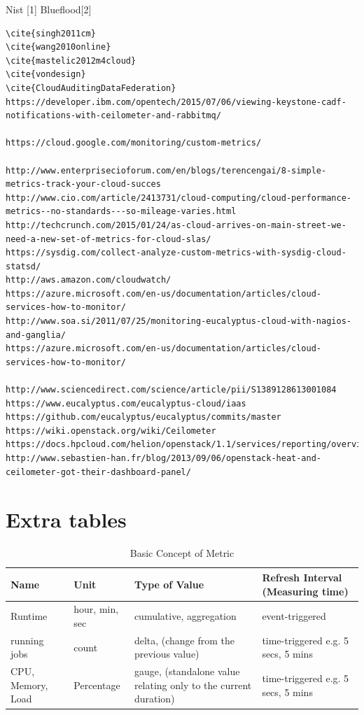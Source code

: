 \documentclass{sig-alternate-05-2015}
\begin{document}
Nist [1]
Blueflood[2]
\begin{verbatim}
\cite{singh2011cm}
\cite{wang2010online}
\cite{mastelic2012m4cloud}
\cite{vondesign}
\cite{CloudAuditingDataFederation}
https://developer.ibm.com/opentech/2015/07/06/viewing-keystone-cadf-notifications-with-ceilometer-and-rabbitmq/

https://cloud.google.com/monitoring/custom-metrics/

http://www.enterprisecioforum.com/en/blogs/terencengai/8-simple-metrics-track-your-cloud-succes
http://www.cio.com/article/2413731/cloud-computing/cloud-performance-metrics--no-standards---so-mileage-varies.html
http://techcrunch.com/2015/01/24/as-cloud-arrives-on-main-street-we-need-a-new-set-of-metrics-for-cloud-slas/
https://sysdig.com/collect-analyze-custom-metrics-with-sysdig-cloud-statsd/
http://aws.amazon.com/cloudwatch/
https://azure.microsoft.com/en-us/documentation/articles/cloud-services-how-to-monitor/
http://www.soa.si/2011/07/25/monitoring-eucalyptus-cloud-with-nagios-and-ganglia/
https://azure.microsoft.com/en-us/documentation/articles/cloud-services-how-to-monitor/

http://www.sciencedirect.com/science/article/pii/S1389128613001084
https://www.eucalyptus.com/eucalyptus-cloud/iaas
https://github.com/eucalyptus/eucalyptus/commits/master
https://wiki.openstack.org/wiki/Ceilometer
https://docs.hpcloud.com/helion/openstack/1.1/services/reporting/overview/
http://www.sebastien-han.fr/blog/2013/09/06/openstack-heat-and-ceilometer-got-their-dashboard-panel/
\end{verbatim}

\section{Extra tables}

\begin{table}[htb]

\caption{Basic Concept of Metric}
\label{T:BCmetrics}
\bigskip
\begin{tabular}{p{}p{}p{}p{}}
Name & Unit & Type of Value & Refresh Interval (Measuring time) \\
\hline
Runtime &
hour, min, sec &
cumulative,
aggregation &
event-triggered \\
\hline 
running jobs &
count &
delta, 
(change from the previous value) &
time-triggered e.g. 5 secs, 5 mins\\
\hline
CPU, Memory, Load &
Percentage &
gauge,  
(standalone value relating only to the current duration) &
time-triggered e.g. 5 secs, 5 mins\\
\hline
\end{tabular}

\end{table}
\end{document}
